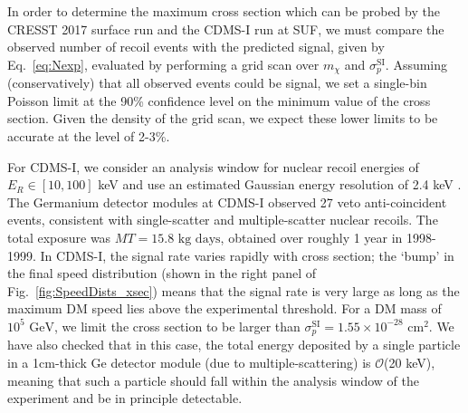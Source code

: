 \documentclass[prd,twocolumn,showpacs,nofootinbib,aps]{revtex4-1}
\begin{document}
In order to determine the maximum cross section which can be probed by the CRESST 2017 surface run and the CDMS-I run at SUF, we must compare the observed number of recoil events with the predicted signal, given by Eq.~\eqref{eq:Nexp}, evaluated by performing a grid scan over $m_\chi$ and $\sigma_p^\mathrm{SI}$. Assuming (conservatively) that all observed events could be signal, we set a single-bin Poisson limit at the 90\% confidence level on the minimum value of the cross section. Given the density of the grid scan, we expect these lower limits to be accurate at the level of 2-3\%.


For CDMS-I, we consider an analysis window for nuclear recoil energies of $E_R \in [10, 100]$ keV and use an estimated Gaussian energy resolution of 2.4 keV \cite{Abrams:2002nb}. The Germanium detector modules at CDMS-I observed 27 veto anti-coincident events, consistent with single-scatter and multiple-scatter nuclear recoils. The total exposure  was $MT = 15.8\,\,\mathrm{kg}\,\, \mathrm{days}$, obtained over roughly 1 year in 1998-1999. In CDMS-I, the signal rate varies rapidly with cross section; the `bump' in the final speed distribution (shown in the right panel of Fig.~\ref{fig:SpeedDists_xsec}) means that the signal rate is very large as long as the maximum DM speed lies above the experimental threshold. For a DM mass of $10^5 \,\,\mathrm{GeV}$, we limit the cross section to be larger than $\sigma_p^\mathrm{SI} = 1.55 \times 10^{-28}\,\,\mathrm{cm}^2$. We have also checked that in this case, the total energy deposited by a single particle in a 1cm-thick Ge detector module (due to multiple-scattering) is $\mathcal{O}$(20 keV), meaning that such a particle should fall within the analysis window of the experiment and be in principle detectable.


\end{document}
